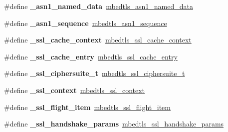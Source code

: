 \begin{DoxyCompactItemize}
\mbox{\label{compat-1_83_8h_a9f66ae656b0547f42ec38e7461a9893d}} 
\#define {\bfseries \+\_\+asn1\+\_\+named\+\_\+data}~\mbox{\hyperlink{structmbedtls__asn1__named__data}{mbedtls\+\_\+asn1\+\_\+named\+\_\+data}}
\item 
\mbox{\label{compat-1_83_8h_a1322884db4e349a6f1e4c2958d8f11f8}} 
\#define {\bfseries \+\_\+asn1\+\_\+sequence}~\mbox{\hyperlink{structmbedtls__asn1__sequence}{mbedtls\+\_\+asn1\+\_\+sequence}}
\item 
\mbox{\label{compat-1_83_8h_ac8ffcccddb747c8015d7531f51539f62}} 
\#define {\bfseries \+\_\+ssl\+\_\+cache\+\_\+context}~\mbox{\hyperlink{structmbedtls__ssl__cache__context}{mbedtls\+\_\+ssl\+\_\+cache\+\_\+context}}
\item 
\mbox{\label{compat-1_83_8h_a0c791e79ffd9ba10974c607f3dcbfbd8}} 
\#define {\bfseries \+\_\+ssl\+\_\+cache\+\_\+entry}~\mbox{\hyperlink{structmbedtls__ssl__cache__entry}{mbedtls\+\_\+ssl\+\_\+cache\+\_\+entry}}
\item 
\mbox{\label{compat-1_83_8h_a22b36588126a8a3d8834561431531985}} 
\#define {\bfseries \+\_\+ssl\+\_\+ciphersuite\+\_\+t}~\mbox{\hyperlink{structmbedtls__ssl__ciphersuite__t}{mbedtls\+\_\+ssl\+\_\+ciphersuite\+\_\+t}}
\item 
\mbox{\label{compat-1_83_8h_acd2ac222d081f1a637cc2b338414b306}} 
\#define {\bfseries \+\_\+ssl\+\_\+context}~\mbox{\hyperlink{structmbedtls__ssl__context}{mbedtls\+\_\+ssl\+\_\+context}}
\item 
\mbox{\label{compat-1_83_8h_a64422c387d642c737bfc2fd8fc78d267}} 
\#define {\bfseries \+\_\+ssl\+\_\+flight\+\_\+item}~\mbox{\hyperlink{structmbedtls__ssl__flight__item}{mbedtls\+\_\+ssl\+\_\+flight\+\_\+item}}
\item 
\mbox{\label{compat-1_83_8h_ab75b105f18bb97a621fde82e7049828d}} 
\#define {\bfseries \+\_\+ssl\+\_\+handshake\+\_\+params}~\mbox{\hyperlink{structmbedtls__ssl__handshake__params}{mbedtls\+\_\+ssl\+\_\+handshake\+\_\+params}}
\item 
\mbox{\label{compat-1_83_8h_a7f41b8c50c590480d34cb1e37712c005}} 

\end{DoxyCompactItemize}
